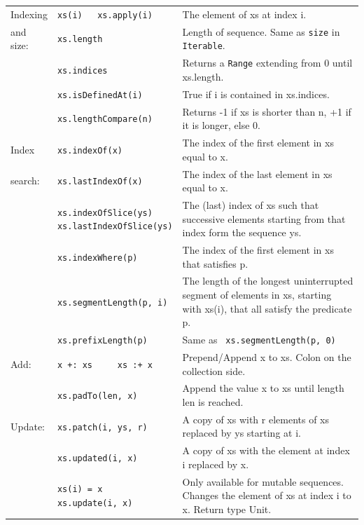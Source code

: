 \documentclass[article, a5paper]{memoir}
\renewcommand{\arraystretch}{0.9}
\begin{document}
{\small\renewcommand{\arraystretch}{1.1}
\begin{tabular}{@{}l p{3.75cm} p{6.8cm}}


  Indexing & \texttt{xs(i)  ~ xs.apply(i)} & The element of xs at index i.\\   \cline{2-3}

   and size: & \texttt{xs.length} & Length of sequence. Same as \texttt{size} in \texttt{Iterable}.\\\cline{2-3}
   & \texttt{xs.indices} & Returns a \texttt{Range} extending from 0 until xs.length.\\\cline{2-3}
   & \texttt{xs.isDefinedAt(i)} & True if i is contained in xs.indices.\\\cline{2-3}
   & \texttt{xs.lengthCompare(n)} & Returns -1 if xs is shorter than n, +1 if it is longer, else 0. \\\cline{1-3}


  Index & \texttt{xs.indexOf(x)} & The index of the first element in xs equal to x.\\   \cline{2-3}
  search: & \texttt{xs.lastIndexOf(x)} & The index of the last element in xs equal to x.\\\cline{2-3}
   & \texttt{xs.indexOfSlice(ys) \newline xs.lastIndexOfSlice(ys)} & The (last) index of xs such that successive elements starting from that index form the sequence ys.\\\cline{2-3}
   & \texttt{xs.indexWhere(p)} & The index of the first element in xs that satisfies p.\\\cline{2-3}
   & \texttt{xs.segmentLength(p, i)} & The length of the longest uninterrupted segment of elements in xs, starting with xs(i), that all satisfy the predicate p.\\\cline{2-3}
   & \texttt{xs.prefixLength(p)} &  	Same as \texttt{ xs.segmentLength(p, 0)}\\\cline{1-3}


  Add: & {\texttt{x~+:~xs~~~~~xs~:+~x}}  & Prepend/Append x to xs. Colon on the collection side. \\   \cline{2-3}
   & \texttt{xs.padTo(len, x)} & Append the value x to xs until length len is reached.\\\cline{1-3}


  Update: & \texttt{xs.patch(i, ys, r)} &  A copy of xs with r elements of xs replaced by ys starting at i. \\   \cline{2-3}
   & \texttt{xs.updated(i, x)} & A copy of xs with the element at index i replaced by x.\\\cline{2-3}
   & \texttt{xs(i) = x \newline xs.update(i, x)} & Only available for mutable sequences. Changes the element of xs at index i to x. Return type Unit.\\\cline{1-3}



\end{tabular}}
\end{document}
